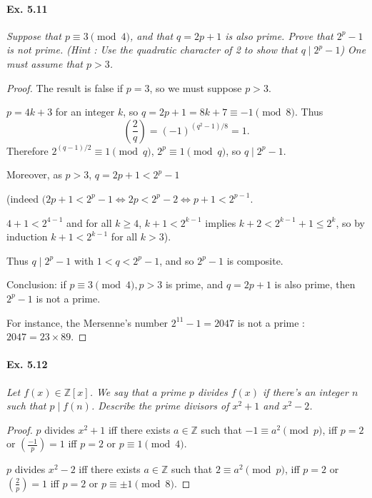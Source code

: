 \documentclass[11pt,a4paper]{article}
\newcommand{\Z}{\mathbb{Z}}
\newcommand{\legendre}[2]{\genfrac{(}{)}{}{}{#1}{#2}}
\begin{document}
\paragraph{Ex. 5.11}

{\it  Suppose that $p \equiv 3 \pmod 4$, and that $q = 2p+1$ is also prime. Prove that $2^p -1$ is not prime. (Hint : Use the quadratic character of 2 to show that $q\mid 2^p-1$) One must assume that $p>3$.
}

\begin{proof}
The result is false if $p=3$, so we must suppose $p>3$.

$p=4k+3$ for an integer $k$, so $q = 2p+1 = 8k+7 \equiv -1 \pmod 8$. Thus
$$\legendre{2}{q} = (-1)^{(q^2-1)/8} = 1.$$
Therefore $2^{(q-1)/2} \equiv 1 \pmod q$, $2^p  \equiv 1 \pmod q$, so $q \mid 2^p-1$.

Moreover, as $p>3$, $q=2p+1<2^p-1$

(indeed $(2p+1<2^p-1 \iff 2p < 2^p - 2 \iff p +1< 2^{p-1} $.

$4+1 < 2^{4-1}$ and for all $k\geq 4$, $k+1 < 2^{k -1}$ implies $k+2 < 2^{k-1} + 1\leq 2^k$, so by induction $k+1 < 2^{k -1}$ for all $k>3$).

Thus $q \mid 2^p-1$ with $1 < q < 2^p-1$, and so $2^p - 1$ is composite.

Conclusion: if $p \equiv 3 \pmod 4, p>3$ is prime, and  $q = 2p+1$ is also prime, then $2^p - 1$ is not a prime.

For instance, the Mersenne's number $2^{11} - 1 =2047$ is not a prime : $2047 = 23 \times 89$.
\end{proof}

\paragraph{Ex. 5.12}

{\it Let $f(x) \in \Z[x]$. We say that a prime $p$ divides $f(x)$ if there's an integer $n$ such that $p \mid f(n)$. Describe the prime divisors of $x^2 + 1$ and $x^2 -2$.
}

\begin{proof}
$p$ divides $x^2+1$ iff there exists $a \in \Z$ such that $-1 \equiv a^2 \pmod p$, iff $p=2$ or $\legendre{-1}{p} = 1$ iff $ p=2$ or $p \equiv 1 \pmod 4$.

$p$ divides $x^2-2$ iff there exists $a \in \Z$ such that $2 \equiv a^2 \pmod p$, iff $p=2$ or  $\legendre{2}{p} = 1$ iff $p=2$ or $p \equiv \pm 1 \pmod 8$.
\end{proof}
\end{document}
